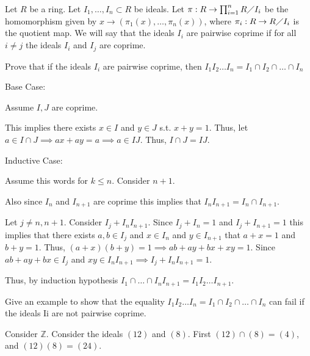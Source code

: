 \documentclass[12pt, letterpaper]{article}
\newcommand{\Z}{\mathbb{Z}}
\begin{document}
\color{\TextColor}
\pagecolor{\colormode}
\setlength{\parindent}{0pt}
\pagestyle{fancy}
\fancyhf{}


\begin{problem}{}
    Let $R$ be a ring. Let $I_1,\dots, I_n \subset R$ be ideals. Let 
    $\pi : R \to \prod_{i=1}^n R \diagup I_i$ be the homomorphism
given by $x \to (\pi_1(x), \dots, \pi_n(x))$, where $\pi_i : R \to R \diagup I_i$ is the quotient map. We will say
that the ideals $I_i$ are pairwise coprime if for all $i \neq j$ the ideals $I_i$ and $I_j$ are coprime.
\end{problem}

\begin{subproblem}{}
    Prove that if the ideals $I_i$ are pairwise coprime, then $I_1I_2\dots I_n = I_1 \cap I_2 \cap \dots \cap I_n$
\end{subproblem}
\begin{problemproof}
    Base Case:

    Assume $I, J$ are coprime.

    This implies there exists $x \in I$ and $y \in J$ s.t. $x+y=1$. Thus, let $a \in I \cap J \implies ax+ay=a \implies a \in IJ$.
    Thus, $I \cap J = IJ$.

    Inductive Case:

    Assume this words for $k \leq n$. Consider $n+1$.

    Also since $I_n$ and $I_{n+1}$ are coprime this implies that $I_nI_{n+1}=I_n \cap I_{n+1}$.

    Let $j \neq n,n+1$. Consider $I_j + I_n I_{n+1}$. Since $I_j + I_n = 1$ and $I_j + I_{n+1} = 1$ this implies that there exists $a,b \in I_j$ and $x \in I_n$ and $y \in I_{n+1}$ that $a+x=1$
    and $b+y=1$. Thus, $(a+x)(b+y)=1 \implies ab+ay+bx+xy = 1$. Since $ab+ay+bx \in I_j$ and $xy \in I_nI_{n+1} \implies I_j + I_nI_{n+1} = 1$.

    Thus, by induction hypothesis $I_1 \cap \dots \cap I_nI_{n+1} = I_1I_2\dots I_{n+1}$.
\end{problemproof}

\begin{subproblem}{}
    Give an example to show that the equality $I_1I_2 \dots I_n = I_1 \cap I_2 \cap \dots \cap I_n$ can fail if
the ideals Ii are not pairwise coprime.
\end{subproblem}
\begin{problemproof}
    Consider $\Z$. Consider the ideals $(12)$ and $(8)$. First $(12) \cap (8) = (4)$, and $(12)(8)=(24)$.
\end{problemproof}
\end{document}
